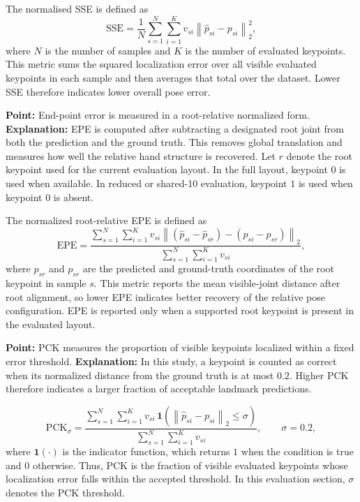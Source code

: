 \documentclass[10pt,letterpaper]{article}
\begin{document}
The normalised SSE is defined as
\begin{equation}
\mathrm{SSE} =
\frac{1}{N}
\sum_{s=1}^{N}
\sum_{i=1}^{K}
v_{si}\left\|
\hat{p}_{si} - p_{si}
\right\|_2^2,
\label{eq:sse}
\end{equation}
where \(N\) is the number of samples and \(K\) is the number of evaluated keypoints. This metric sums the squared localization error over all visible evaluated keypoints in each sample and then averages that total over the dataset. Lower SSE therefore indicates lower overall pose error.

\medskip
\noindent\textbf{Point:} End-point error is measured in a root-relative normalized form.  
\textbf{Explanation:} EPE is computed after subtracting a designated root joint from both the prediction and the ground truth. This removes global translation and measures how well the relative hand structure is recovered. Let \(r\) denote the root keypoint used for the current evaluation layout. In the full layout, keypoint \(0\) is used when available. In reduced or shared-10 evaluation, keypoint \(1\) is used when keypoint \(0\) is absent.

The normalized root-relative EPE is defined as
\begin{equation}
\mathrm{EPE} =
\frac{
\sum_{s=1}^{N}
\sum_{i=1}^{K}
v_{si}
\left\|
(\hat{p}_{si} - \hat{p}_{sr}) - (p_{si} - p_{sr})
\right\|_2
}{
\sum_{s=1}^{N}
\sum_{i=1}^{K}
v_{si}
},
\label{eq:epe}
\end{equation}
where \(\hat{p}_{sr}\) and \(p_{sr}\) are the predicted and ground-truth coordinates of the root keypoint in sample \(s\). This metric reports the mean visible-joint distance after root alignment, so lower EPE indicates better recovery of the relative pose configuration. EPE is reported only when a supported root keypoint is present in the evaluated layout.

\medskip
\noindent\textbf{Point:} PCK measures the proportion of visible keypoints localized within a fixed error threshold.  
\textbf{Explanation:} In this study, a keypoint is counted as correct when its normalized distance from the ground truth is at most \(0.2\). Higher PCK therefore indicates a larger fraction of acceptable landmark predictions.

\begin{equation}
\mathrm{PCK}_{\sigma} =
\frac{
\sum_{s=1}^{N}
\sum_{i=1}^{K}
v_{si}\,\mathbf{1}
\left(
\left\|
\hat{p}_{si} - p_{si}
\right\|_2 \le \sigma
\right)
}{
\sum_{s=1}^{N}
\sum_{i=1}^{K}
v_{si}
},
\qquad \sigma = 0.2,
\label{eq:pck}
\end{equation}
where \(\mathbf{1}(\cdot)\) is the indicator function, which returns \(1\) when the condition is true and \(0\) otherwise. Thus, PCK is the fraction of visible evaluated keypoints whose localization error falls within the accepted threshold. In this evaluation section, \(\sigma\) denotes the PCK threshold.
\end{document}
